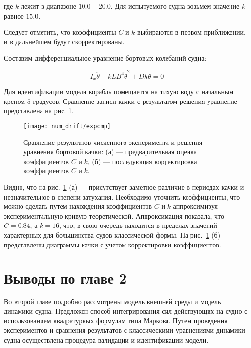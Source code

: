 где $k$ лежит в диапазоне $10.0$ -- $20.0$. Для испытуемого судна возьмем значение $k$ равное $15.0$.

Следует отметить, что коэффициенты $C$ и $k$ выбираются в первом приближении, и в дальнейшем будут скорректированы.

Составим дифференциальное уравнение бортовых колебаний судна:

\begin{equation}
	I_x \ddot{\theta} + kLB^4\dot{\theta}^2 + Dh \theta = 0
	\label{roll_eq}
\end{equation}

Для идентификации модели корабль помещается на тихую воду с начальным креном $5$ градусов. Сравнение записи качки с результатом решения уравнение представлена на рис. \ref{drift:expcmp}.

\begin{figure}
	\texttt{[image: num\_drift/expcmp]}
	\caption{Сравнение результатов численного эксперимента и решения уравнения бортовой качки: (а) --- предварительная оценка коэффициентов $C$ и $k$, (б) --- последующая корректировка коэффициентов $C$ и $k$.}
	\label{drift:expcmp}
\end{figure}

Видно, что на рис.~\ref{drift:expcmp} (а) --- присутствует заметное различие в периодах качки и незначительное в степени затухания. Необходимо уточнить коэффициенты, что можно сделать путем 
нахождения коэффициентов $C$ и $k$ аппроксимируя экспериментальную кривую теоретической.
Аппроксимация показала, что $C=0.84$, а $k=16$, что, в свою очередь находится в пределах значений характерных для большинства судов классической формы. На рис.~\ref{drift:expcmp} (б) представлены 
диаграммы качки с учетом корректировки коэффициентов.

%



\section{Выводы по главе 2}

Во второй главе подробно рассмотрены модель внешней среды и модель динамики судна.
Предложен способ интегрирования сил действующих на судно с использованием квадратурных формулам типа Маркова.
Путем проведения экспериментов и сравнения результатов с классическими уравнениями динамики судна осуществлена процедура валидации 
и идентификации модели.








